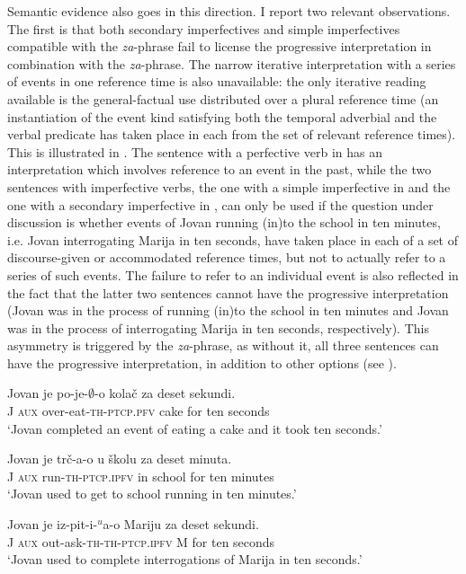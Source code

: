\documentclass[output=paper]{langscibook}
\begin{document}
\noindent Semantic evidence also goes in this direction. I report two relevant observations. The first is that both secondary imperfectives and simple imperfectives compatible with the \textit{za}-phrase fail to license the progressive interpretation in combination with the \textit{za}-phrase. The narrow iterative interpretation with a series of events in one reference time is also unavailable: the only iterative reading available is the general-factual use distributed over a plural reference time (an instantiation of the event kind satisfying both the temporal adverbial and the verbal predicate has taken place in each from the set of relevant reference times). This is illustrated in . The sentence with a perfective verb in  has an interpretation which involves reference to an event in the past, while the two sentences with imperfective verbs, the one with a simple imperfective in  and the one with a secondary imperfective in , can only be used if the question under discussion is whether events of Jovan running (in)to the school in ten minutes, i.e. Jovan interrogating Marija in ten seconds, have taken place in each of a set of discourse-given or accommodated reference times, but not to actually refer to a series of such events. The failure to refer to an individual event is also reflected in the fact that the latter two sentences cannot have the progressive interpretation (Jovan was in the process of running (in)to the school in ten minutes and Jovan was in the process of interrogating Marija in ten seconds, respectively). This asymmetry is triggered by the \textit{za}-phrase, as without it, all three sentences can have the progressive interpretation, in addition to other options (see ).

\ea\label{ars:ex:za}
	\begin{xlist} 
		
\ex  \gll Jovan je po-je-$\emptyset$-o kolač za deset	sekundi.\\
J \textsc{aux} over-eat-\textsc{th-ptcp.pfv} cake for ten seconds\\
\glt `Jovan completed an event of eating a cake and it took ten seconds.’\label{ars:ex:zaa}

\ex  \gll Jovan je trč-a-o u školu za deset	minuta.\\
J \textsc{aux} run-\textsc{th-ptcp.ipfv} in school for ten minutes\\
\glt `Jovan used to get to school running in ten minutes.’\label{ars:ex:zab}

\ex  \gll Jovan je iz-pit-i-$^u$a-o Mariju za deset	sekundi.\\
J \textsc{aux} out-ask-\textsc{th-th-ptcp.ipfv} M for ten seconds\\
\glt `Jovan used to complete interrogations of Marija in ten seconds.’\label{ars:ex:zac}
\end{xlist}
\z
	
\end{document}
